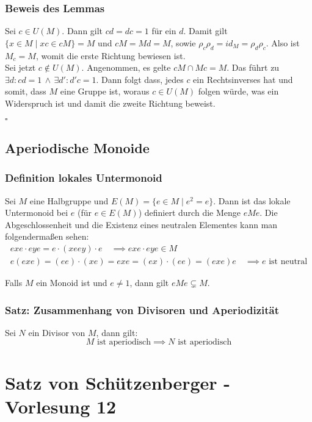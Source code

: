 \documentclass[12pt, german]{article}
\newcommand{\bewiesen}{
	
	\begin{flushright}
		$\square$  \\
\end{flushright}}
\begin{document}
	\subsubsection{Beweis des Lemmas}
	Sei $c \in U(M)$. Dann gilt $cd = dc = 1$ für ein $d$.
	Damit gilt $\{x \in M \mid xc \in cM\}  = M$ und $cM = Md = M$, sowie $\rho_c\rho_d = id_M = \rho_d\rho_c$. 
	Also ist $M_c=M$, womit die erste Richtung bewiesen ist.\\
	
	Sei jetzt $c \notin U(M)$.
	Angenommen, es gelte $cM \cap Mc = M$. 
	Das führt zu $\exists d : cd = 1 \, \wedge \, \exists d': d'c=1$. Dann folgt dass, jedes $c$ ein Rechtsinverses hat und somit, dass $M$ eine Gruppe ist, woraus $c \in U(M)$ folgen würde, was ein Widerspruch ist und damit die zweite Richtung beweist.
	\bewiesen
	
	\subsection{Aperiodische Monoide}
	\subsubsection{Definition lokales Untermonoid}
	Sei $M$ eine Halbgruppe  und $E(M) = \{e \in M \mid e^2 = e\}$. Dann ist das lokale Untermonoid bei $e$ (für $e \in E(M)$) definiert durch die Menge $eMe$.
	Die Abgeschlossenheit und die Existenz eines neutralen Elementes kann man folgenderma\ss en sehen:
	\begin{align*}
		exe \cdot eye = e \cdot (xeey) \cdot e \quad \implies exe \cdot eye \in M\\
		e(exe) = (ee)\cdot(xe) = exe = (ex)\cdot (ee) = (exe)e\quad \implies e \text{ ist neutral}
	\end{align*}
	
	Falls $M$ ein Monoid ist und $e\not = 1$, dann gilt $eMe \subsetneq M$.
	
	\subsubsection{Satz: Zusammenhang von Divisoren und Aperiodizität}
	Sei $N$ ein Divisor von $M$, dann gilt: $$M \text{ ist aperiodisch} \implies N \text{ ist aperiodisch}$$
	
	\section{Satz von Schützenberger - Vorlesung 12}
\end{document}
